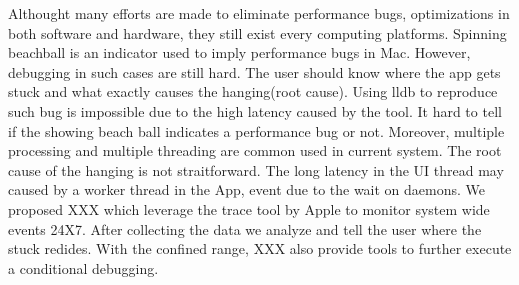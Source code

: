 Althought many efforts are made to eliminate performance bugs,
optimizations in both software and hardware,
they still exist every computing platforms. 
Spinning beachball is an indicator used to imply performance bugs in Mac.
However, debugging in such cases are still hard.
The user should know where the app gets stuck and what exactly causes the hanging(root cause).
Using lldb to reproduce such bug is impossible due to the high latency caused by the tool.
It hard to tell if the showing beach ball indicates a performance bug or not.
Moreover, multiple processing and multiple threading are common used in current system.
The root cause of the hanging is not straitforward.
The long latency in the UI thread may caused by a worker thread in the App, event due to the wait on daemons. 
We proposed XXX which leverage the trace tool by Apple to monitor system wide events 24X7.
After collecting the data we analyze and tell the user where the stuck redides.
With the confined range, XXX also provide tools to further execute a conditional debugging.
